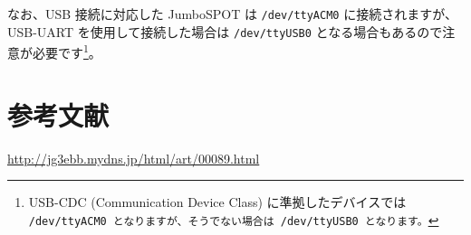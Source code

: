 \documentclass[a4j,oneside]{ujbook}
\begin{document}
なお、USB 接続に対応した JumboSPOT は \verb+/dev/ttyACM0+ に接続されますが、USB-UART を使用して接続した場合は \verb+/dev/ttyUSB0+ となる場合もあるので注意が必要です\footnote{USB-CDC (Communication Device Class) に準拠したデバイスでは \tt{/dev/ttyACM0} となりますが、そうでない場合は \tt{/dev/ttyUSB0} となります。}。

\section{参考文献}
\begin{description}[style=nextline]
 \item [JumboSPOT+bluetooth] \url{http://jg3ebb.mydns.jp/html/art/00089.html}
\end{description}
\end{document}
